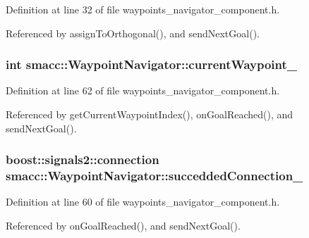 Definition at line 32 of file waypoints\+\_\+navigator\+\_\+component.\+h.



Referenced by assign\+To\+Orthogonal(), and send\+Next\+Goal().

\subsubsection[{\texorpdfstring{current\+Waypoint\+\_\+}{currentWaypoint_}}]{\setlength{\rightskip}{0pt plus 5cm}int smacc\+::\+Waypoint\+Navigator\+::current\+Waypoint\+\_\+\hspace{0.3cm}{\ttfamily [private]}}\hypertarget{classsmacc_1_1WaypointNavigator_a9a0102946593081338f7bd259f4670bc}{}\label{classsmacc_1_1WaypointNavigator_a9a0102946593081338f7bd259f4670bc}


Definition at line 62 of file waypoints\+\_\+navigator\+\_\+component.\+h.



Referenced by get\+Current\+Waypoint\+Index(), on\+Goal\+Reached(), and send\+Next\+Goal().

\subsubsection[{\texorpdfstring{succedded\+Connection\+\_\+}{succeddedConnection_}}]{\setlength{\rightskip}{0pt plus 5cm}boost\+::signals2\+::connection smacc\+::\+Waypoint\+Navigator\+::succedded\+Connection\+\_\+\hspace{0.3cm}{\ttfamily [private]}}\hypertarget{classsmacc_1_1WaypointNavigator_a932d5378c3ef5bd4e8e3152ac657112f}{}\label{classsmacc_1_1WaypointNavigator_a932d5378c3ef5bd4e8e3152ac657112f}


Definition at line 60 of file waypoints\+\_\+navigator\+\_\+component.\+h.



Referenced by on\+Goal\+Reached(), and send\+Next\+Goal().

